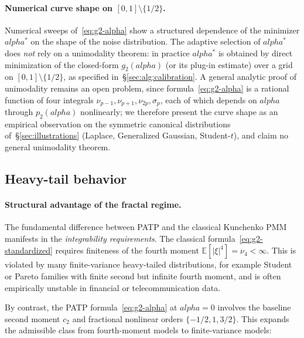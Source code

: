 \documentclass[11pt]{article}
\def\alpha{alpha}%
\theoremstyle{definition}
\newcommand{\E}{\mathbb{E}}
\begin{document}
\paragraph{Numerical curve shape on $[0, 1] \setminus \{1/2\}$.}
Numerical sweeps of~\eqref{eq:g2-alpha} show a structured dependence of the
minimizer $\alpha^{*}$ on the shape of the noise distribution. The adaptive
selection of $\alpha^{*}$ does \emph{not} rely on a unimodality theorem: in
practice $\alpha^{*}$ is obtained by direct minimization of the closed-form
$g_2(\alpha)$ (or its plug-in estimate) over a grid on $[0,1]\setminus\{1/2\}$,
as specified in~\S\ref{sec:alg:calibration}. A general analytic proof of
unimodality remains an open problem, since formula~\eqref{eq:g2-alpha} is a
rational function of four integrals $\nu_{p-1}, \nu_{p+1}, \nu_{2p}, \sigma_p$,
each of which depends on $\alpha$ through $p_2(\alpha)$ nonlinearly; we
therefore present the curve shape as an empirical observation on the symmetric
canonical distributions of~\S\ref{sec:illustrations} (Laplace, Generalized
Gaussian, Student-$t$), and claim no general unimodality theorem.

\subsection{Heavy-tail behavior}\label{sec:eff:heavy}

\paragraph{Structural advantage of the fractal regime.}
The fundamental difference between PATP and the classical Kunchenko PMM
manifests in the \emph{integrability requirements}. The classical
formula~\eqref{eq:g2-standardized} requires finiteness of the fourth
moment $\E[|\xi|^4] = \nu_4 < \infty$. This is violated by many
finite-variance heavy-tailed distributions, for example Student or Pareto
families with finite second but infinite fourth moment, and is often
empirically unstable in financial or telecommunication data.

By contrast, the PATP formula~\eqref{eq:g2-alpha} at $\alpha = 0$ involves
the baseline second moment $c_2$ and fractional nonlinear orders
$\{-1/2, 1, 3/2\}$. This expands the admissible class from fourth-moment
models to finite-variance models:
\end{document}
